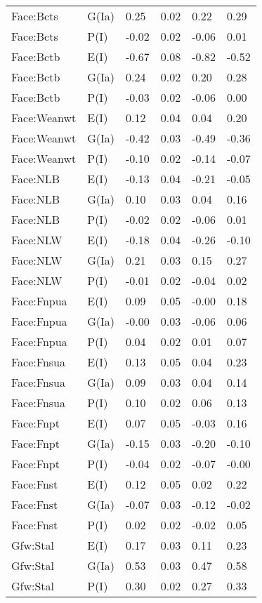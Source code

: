 \begin{center}
\begin{longtable}{|p{1.1in}|p{0.7in}|p{0.7in}|p{0.6in}|p{0.6in}|p{0.6in}|}
  Face:Bcts & G(Ia) & 0.25 & 0.02 & 0.22 & 0.29 \\ 
  Face:Bcts & P(I) & -0.02 & 0.02 & -0.06 & 0.01 \\ 
  Face:Bctb & E(I) & -0.67 & 0.08 & -0.82 & -0.52 \\ 
  Face:Bctb & G(Ia) & 0.24 & 0.02 & 0.20 & 0.28 \\ 
  Face:Bctb & P(I) & -0.03 & 0.02 & -0.06 & 0.00 \\ 
  Face:Weanwt & E(I) & 0.12 & 0.04 & 0.04 & 0.20 \\ 
  Face:Weanwt & G(Ia) & -0.42 & 0.03 & -0.49 & -0.36 \\ 
  Face:Weanwt & P(I) & -0.10 & 0.02 & -0.14 & -0.07 \\ 
  Face:NLB & E(I) & -0.13 & 0.04 & -0.21 & -0.05 \\ 
  Face:NLB & G(Ia) & 0.10 & 0.03 & 0.04 & 0.16 \\ 
  Face:NLB & P(I) & -0.02 & 0.02 & -0.06 & 0.01 \\ 
  Face:NLW & E(I) & -0.18 & 0.04 & -0.26 & -0.10 \\ 
  Face:NLW & G(Ia) & 0.21 & 0.03 & 0.15 & 0.27 \\ 
  Face:NLW & P(I) & -0.01 & 0.02 & -0.04 & 0.02 \\ 
  Face:Fnpua & E(I) & 0.09 & 0.05 & -0.00 & 0.18 \\ 
  Face:Fnpua & G(Ia) & -0.00 & 0.03 & -0.06 & 0.06 \\ 
  Face:Fnpua & P(I) & 0.04 & 0.02 & 0.01 & 0.07 \\ 
  Face:Fnsua & E(I) & 0.13 & 0.05 & 0.04 & 0.23 \\ 
  Face:Fnsua & G(Ia) & 0.09 & 0.03 & 0.04 & 0.14 \\ 
  Face:Fnsua & P(I) & 0.10 & 0.02 & 0.06 & 0.13 \\ 
  Face:Fnpt & E(I) & 0.07 & 0.05 & -0.03 & 0.16 \\ 
  Face:Fnpt & G(Ia) & -0.15 & 0.03 & -0.20 & -0.10 \\ 
  Face:Fnpt & P(I) & -0.04 & 0.02 & -0.07 & -0.00 \\ 
  Face:Fnst & E(I) & 0.12 & 0.05 & 0.02 & 0.22 \\ 
  Face:Fnst & G(Ia) & -0.07 & 0.03 & -0.12 & -0.02 \\ 
  Face:Fnst & P(I) & 0.02 & 0.02 & -0.02 & 0.05 \\ 
  Gfw:Stal & E(I) & 0.17 & 0.03 & 0.11 & 0.23 \\ 
  Gfw:Stal & G(Ia) & 0.53 & 0.03 & 0.47 & 0.58 \\ 
  Gfw:Stal & P(I) & 0.30 & 0.02 & 0.27 & 0.33 \\ 

\end{longtable}
\end{center}
